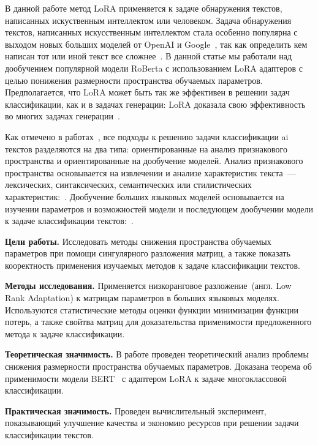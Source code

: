     В данной работе метод LoRA применяется к задаче обнаружения текстов, написанных искуственным интеллектом или человеком.
    Задача обнаружения текстов, написанных искусственным интеллектом стала особенно популярна с выходом новых больших моделей от OpenAI и Google~\cite{OpenAI, Google}, так как определить кем написан тот или иной текст все сложнее~\cite{anderson2023ai, weber2023testing}. В данной статье мы работали над дообучением популярной модели RoBerta с использованием LoRA адаптеров с целью понижения размерности пространства обучаемых параметров. Предполагается, что LoRA может быть так же эффективен в решении задач классификации, как и в задачах генерации: LoRA доказала свою эффективность во многих задачах генерации~\cite{dettmers2024qlora,hu2021lora,dai2024instructblip}.

Как отмечено в работах~\cite{he2023mgtbench,abdali2024decoding}, все подходы к решению задачи классификации ai текстов разделяются на два типа: ориентированные на анализ признакового пространства и ориентированные на дообучение моделей. 
 Анализ признакового пространства основывается на извлечении и анализе характеристик текста~--- лексических, синтаксических, семантических или стилистических характеристик:~\cite{liang2023gpt,yu2023gpt,yang2023dna}.
 Дообучение больших языковых моделей основывается на изучении параметров и возможностей модели и последующем дообучении модели к задаче классификации текстов:~\cite{wolf2019huggingface,wolf2019huggingface,qasim2022fine}.


\textbf{Цели работы.}
Исследовать методы снижения пространства обучаемых параметров при помощи сингулярного разложения матриц, а также показать кооректность применения изучаемых методов к задаче классификации текстов. 

\textbf{Методы исследования.}
Применяется низкоранговое разложение~(англ. Low Rank Adaptation) к матрицам параметров в больших языковых моделях. Используются статистические методы оценки функции минимизации функции потерь, а также свойтва матриц для доказательства применимости предложенного метода к задаче классификации.

\textbf{Теоретическая значимость.}
В работе проведен теоретический анализ проблемы снижения размерности пространства обучаемых параметров. Доказана теорема об применимости модели BERT~\cite{vaswani2017attention} с адаптером LoRA к задаче многоклассовой классификации. 

\textbf{Практическая значимость.}
Проведен вычислительный эксперимент, показывающий улучшение качества и экономию ресурсов при решении задачи классификации текстов.